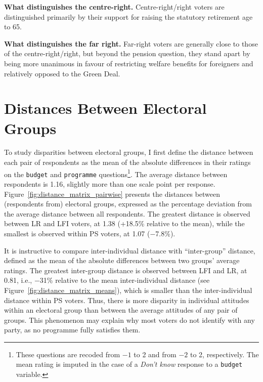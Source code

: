 \documentclass[12pt,english]{article}
\newcommand{\blue}[1]{\textcolor{blue!60!black}{#1}}
\begin{document}
\textbf{What distinguishes the centre-right.} \blue{Centre-right/right voters are distinguished primarily by their support for raising the statutory retirement age to 65.}

\textbf{What distinguishes the far right.} Far-right voters are generally close to those of the centre-right/right, but beyond the pension question, they stand apart by being more unanimous in favour of restricting welfare benefits for foreigners and relatively opposed to the Green Deal.


\section{Distances Between Electoral Groups}
\label{sec:ecarts}

To study disparities between electoral groups, I first define the distance between each pair of respondents as the mean of the absolute differences in their ratings on the \texttt{budget} and \texttt{programme} questions\footnote{These questions are recoded from $-1$ to 2 and from $-2$ to 2, respectively. The mean rating is imputed in the case of a \textit{Don't know} response to a \texttt{budget} variable.}.
\blue{The average distance between respondents is 1.16, slightly more than one scale point per response.} Figure~\ref{fig:distance_matrix_pairwise} presents the distances between (respondents from) electoral groups, expressed as the percentage deviation from the average distance between all respondents.
\blue{The greatest distance is observed between LR and LFI voters, at 1.38 (+18.5\% relative to the mean), while the smallest is observed within PS voters, at 1.07 ($-$7.8\%).}

It is instructive to compare inter-individual distance with ``inter-group'' distance, defined as the mean of the absolute differences between two groups' average ratings. The greatest inter-group distance is observed between LFI and LR, at 0.81, i.e., $-$31\% relative to the mean inter-individual distance (see Figure~\ref{fig:distance_matrix_means}), which is smaller than the inter-individual distance within PS voters.
Thus, \blue{there is more disparity in individual attitudes within an electoral group than between the average attitudes of any pair of groups.
This phenomenon may explain why most voters do not identify with any party, as no programme fully satisfies them.}
\end{document}
